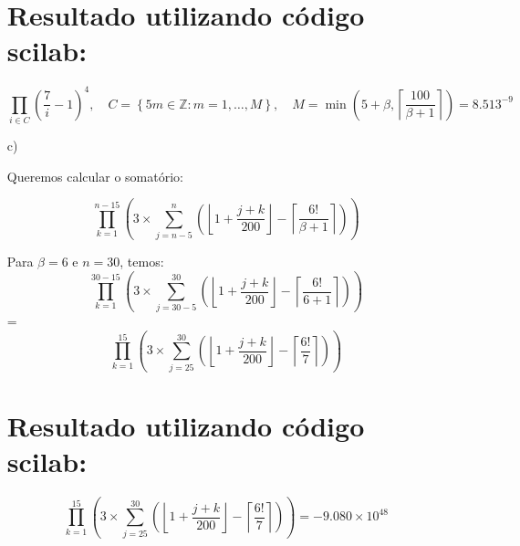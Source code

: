 \begin{enumerate}
\section*{Resultado utilizando  código scilab:}

\[
\prod_{i \in C} \left( \frac{7}{i } -1 \right)^4, \quad C = \left\{ 5m \in \mathbb{Z}: m = 1, \dots, M \right\}, \quad M = \min \left( 5 + \beta, \left\lceil \frac{100}{\beta + 1} \right\rceil \right) = 8.513^{-9}
\]

 \vspace{2em}
      \item[c)]

    Queremos calcular o somatório:

      \[
\prod_{k=1}^{n-15} \left( 3 \times \sum_{j=n-5}^{n} \left( \left\lfloor 1 + \frac{j + k}{200} \right\rfloor - \left\lceil \frac{6!}{\beta + 1} \right\rceil \right) \right)
\]

    Para \(\beta = 6\) e \(n = 30\), temos:
  \[
\prod_{k=1}^{30-15} \left( 3 \times \sum_{j=30-5}^{30} \left( \left\lfloor 1 + \frac{j + k}{200} \right\rfloor - \left\lceil \frac{6!}{6 + 1} \right\rceil \right) \right)
\]
 = \[
\prod_{k=1}^{15} \left( 3 \times \sum_{j=25}^{30} \left( \left\lfloor 1 + \frac{j + k}{200} \right\rfloor - \left\lceil \frac{6!}{7} \right\rceil \right) \right)
\]

\section*{Resultado utilizando  código scilab:}
\[
\prod_{k=1}^{15} \left( 3 \times \sum_{j=25}^{30} \left( \left\lfloor 1 + \frac{j + k}{200} \right\rfloor - \left\lceil \frac{6!}{7} \right\rceil \right) \right) = -9.080 \times 10^{48}
\] 

\end{enumerate}


